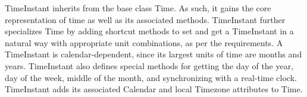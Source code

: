 
TimeInstant inherits from the base class Time.  As such, it gains the core
representation of time as well as its associated methods.   TimeInstant
further specializes Time by adding shortcut methods to set and get a
TimeInstant in a natural way with appropriate unit combinations, as per the
requirements.  A TimeInstant is calendar-dependent, since its largest units
of time are months and years.  TimeInstant also defines special methods for
getting the day of the year, day of the week, middle of the month, and
synchronizing with a real-time clock.  TimeInstant adds its associated
Calendar and local Timezone attributes to Time.
